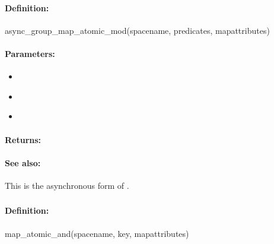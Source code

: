 \paragraph{Definition:}
\begin{rubycode}
async_group_map_atomic_mod(spacename, predicates, mapattributes)
\end{rubycode}

\paragraph{Parameters:}
\begin{itemize}[noitemsep]
\item {}\\

\item {}\\

\item {}\\

\end{itemize}

\paragraph{Returns:}


\paragraph{See also:}  This is the asynchronous form of .

\pagebreak
\subsubsection{}
\label{api:ruby:map_atomic_and}


\paragraph{Definition:}
\begin{rubycode}
map_atomic_and(spacename, key, mapattributes)
\end{rubycode}

